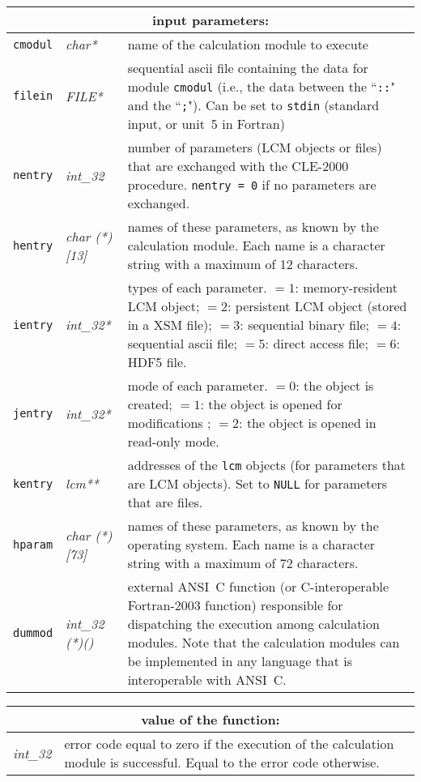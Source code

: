 \noindent
\begin{tabular}{|p{1.5cm}|p{2cm}|p{11cm}|}
\hline
\multicolumn{3}{|c|}{\bf input parameters:} \\
\hline
{\tt cmodul} & {\it char*} & name of the calculation module to execute \\
\hline
{\tt filein} & {\it FILE*} & sequential {\sc ascii} file containing the data for module {\tt cmodul} (i.e., the data between the ``{\tt ::}" and the ``{\tt ;}"). Can be set to {\tt stdin} (standard input, or unit~5 in Fortran) \\
\hline
{\tt nentry} & {\it int\_32} & number of parameters (LCM objects or files) that are exchanged with the CLE-2000 procedure. {\tt nentry = 0} if  no parameters are exchanged. \\
\hline
{\tt hentry} & {\it char (*)[13]} & names of these parameters, as known by the calculation module. Each name is a character string with a maximum of 12 characters. \\
\hline
{\tt ientry} & {\it int\_32*} & types of each parameter. $=1$: memory-resident LCM object; $=2$: persistent LCM object (stored in a XSM file); 
$=3$: sequential binary file;
$=4$: sequential ascii file;
$=5$: direct access file;
$=6$: HDF5 file.
\\
\hline
{\tt jentry} & {\it int\_32*} & mode of each parameter. $=0$: the object is created; $=1$: the object is opened for modifications ; $=2$: the object is opened in read-only mode. \\
\hline
{\tt kentry} & {\it lcm**} & addresses of the {\tt lcm} objects (for parameters that are LCM objects). Set to {\tt NULL} for parameters that are files. \\
\hline
{\tt hparam} & {\it char (*)[73]} & names of these parameters, as known by the operating system. Each name is a character string with a maximum of 72 characters. \\
\hline
{\tt dummod} & {\it int\_32 (*)()} & external ANSI~C function (or C-interoperable Fortran-2003 function) responsible for dispatching the execution among calculation modules. Note that the calculation modules can be implemented in any language that is interoperable with ANSI~C. \\
\hline
\end{tabular}

\vskip 0.4cm

\noindent
\begin{tabular}{|p{4.0cm}|p{11cm}|}
\hline
\multicolumn{2}{|c|}{\bf value of the function:} \\
\hline
{\it int\_32} & error code equal to zero if the execution of the calculation module is successful. Equal to the error code otherwise. \\
\hline
\end{tabular}


